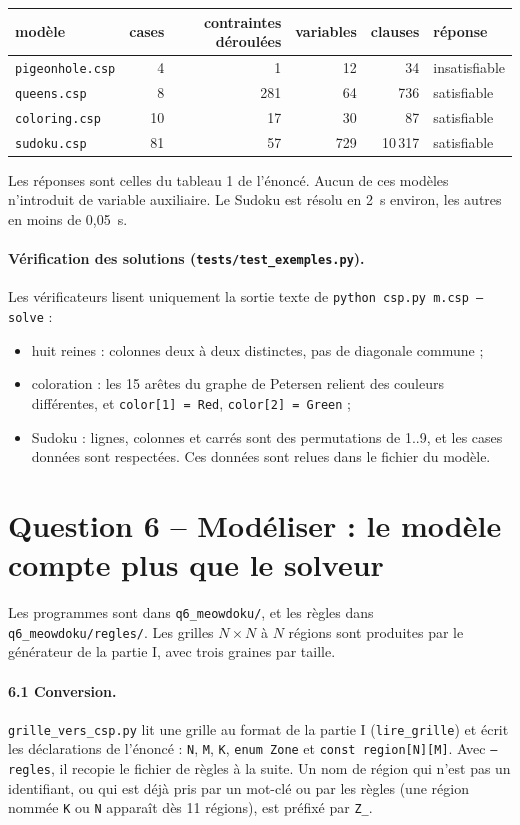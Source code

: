 \documentclass[11pt,a4paper]{article}
\newcommand{\code}[1]{\texttt{#1}}
\begin{document}
\begin{center}
\begin{tabular}{lrrrrl}
\toprule
modèle & cases & contraintes déroulées & variables & clauses & réponse \\
\midrule
\code{pigeonhole.csp} & 4 & 1 & 12 & 34 & insatisfiable \\
\code{queens.csp} & 8 & 281 & 64 & 736 & satisfiable \\
\code{coloring.csp} & 10 & 17 & 30 & 87 & satisfiable \\
\code{sudoku.csp} & 81 & 57 & 729 & 10\,317 & satisfiable \\
\bottomrule
\end{tabular}
\end{center}
Les réponses sont celles du tableau 1 de l'énoncé. Aucun de ces modèles n'introduit de
variable auxiliaire. Le Sudoku est résolu en 2~s environ, les autres en moins de 0,05~s.

\paragraph{Vérification des solutions (\code{tests/test\_exemples.py}).} Les vérificateurs
lisent uniquement la sortie texte de \code{python csp.py m.csp --solve} :
\begin{itemize}
  \item huit reines : colonnes deux à deux distinctes, pas de diagonale commune ;
  \item coloration : les 15 arêtes du graphe de Petersen relient des couleurs différentes, et
        \code{color[1] = Red}, \code{color[2] = Green} ;
  \item Sudoku : lignes, colonnes et carrés sont des permutations de 1..9, et les cases
        données sont respectées. Ces données sont relues dans le fichier du modèle.
\end{itemize}

\section{Question 6 -- Modéliser : le modèle compte plus que le solveur}

Les programmes sont dans \code{q6\_meowdoku/}, et les règles dans
\code{q6\_meowdoku/regles/}. Les grilles $N \times N$ à $N$ régions sont produites par le
générateur de la partie I, avec trois graines par taille.

\paragraph{6.1 Conversion.} \code{grille\_vers\_csp.py} lit une grille au format de la partie I
(\code{lire\_grille}) et écrit les déclarations de l'énoncé : \code{N}, \code{M}, \code{K},
\code{enum Zone} et \code{const region[N][M]}. Avec \code{--regles}, il recopie le fichier de
règles à la suite. Un nom de région qui n'est pas un identifiant, ou qui est déjà pris par un
mot-clé ou par les règles (une région nommée \code{K} ou \code{N} apparaît dès 11 régions),
est préfixé par \code{Z\_}.
\end{document}
